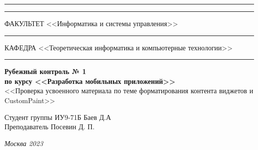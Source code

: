 \documentclass[a4paper, 14pt]{extarticle}
\begin{document}
\begin{titlepage}
\vspace{-25pt}
\hspace{-35pt}\rule{\textwidth}{2.3pt}

\vspace*{-20.3pt}
\hspace{-35pt}\rule{\textwidth}{0.4pt}

\vspace{1.5ex}
\hspace{-35pt} \noindent \small ФАКУЛЬТЕТ\hspace{80pt} <<Информатика и системы управления>>

\vspace*{-16pt}
\hspace{47pt}\rule{0.83\textwidth}{0.4pt}

\vspace{0.5ex}
\hspace{-35pt} \noindent \small КАФЕДРА\hspace{50pt} <<Теоретическая информатика и компьютерные технологии>>

\vspace*{-16pt}
\hspace{30pt}\rule{0.866\textwidth}{0.4pt}
  
\vspace{11em}

\begin{center}
\Large {\bf Рубежный контроль № 1} \\
\large {\bf по курсу <<Разработка мобильных приложений>>} \\
\large <<Проверка усвоенного материала по теме
форматирования контента виджетов и CustomPaint>>
\end{center}\normalsize

\vspace{8em}


\begin{flushright}
  {Студент группы ИУ9-71Б Баев Д.А \hspace*{15pt}\\
  \vspace{2ex}
  Преподаватель Посевин Д. П.\hspace*{15pt}}
\end{flushright}

\bigskip

\vfill


\begin{center}
\textsl{Москва 2023}
\end{center}
\end{titlepage}
\end{document}
